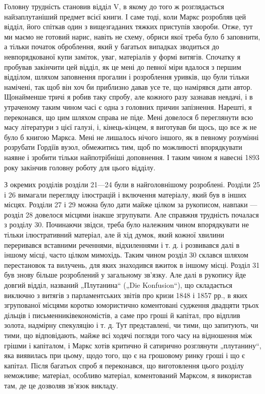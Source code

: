 Головну трудність становив відділ V, в якому до того ж
розглядається найзаплутаніший предмет всієї книги. І саме тоді,
коли Маркс розробляв цей відділ, його спіткав один з вищезгаданих
тяжких приступів хвороби. Отже, тут ми маємо не готовий
нарис, навіть не схему, обриси якої треба було б заповнити,
а тільки початок оброблення, який у багатьох випадках зводиться
до невпорядкованої купи заміток, уваг, матеріалів у формі
витягів. Спочатку я пробував закінчити цей відділ, як це мені
до певної міри вдалося з першим відділом, шляхом заповнення
прогалин і розроблення уривків, що були тільки намічені, так щоб
він хоч би приблизно давав усе те, що намірявся дати автор. Щонайменше
тричі я робив таку спробу, але кожного разу зазнавав
невдачі, і в утраченому таким чином часі є одна з головних причин
запізнення. Нарешті, я переконався, що цим шляхом справа
не піде. Мені довелося б переглянути всю масу літератури з цієї
галузі, і, кінець-кінцем, я виготував би щось, що все ж не було б
книгою Маркса. Мені не лишалось нічого іншого, як в певному
розумінні розрубати Гордіїв вузол, обмежитись тим, щоб по
можливості впорядкувати наявне і зробити тільки найпотрібніші
доповнення. І таким чином я навесні 1893 року закінчив головну
роботу для цього відділу.

З окремих розділів розділи 21—24 були в найголовнішому
розроблені. Розділи 25 і 26 вимагали перегляду ілюстрацій і
включення матеріалу, який був в інших місцях. Розділи 27 і 29 можна
було дати майже цілком за рукописом, навпаки — розділ 28 довелося
місцями інакше згрупувати. Але справжня трудність почалася
з розділу 30. Починаючи звідси, треба було належним чином
впорядкувати не тільки ілюстративний матеріал, але й хід думок,
який кожної хвилини переривався вставними реченнями, відхиленнями
і т. д. і розвивався далі в іншому місці, часто цілком мимохідь.
Таким чином розділ 30 склався шляхом перестановок та вилучень,
для яких знаходився вжиток в іншому місці. Розділ 31 був знову
більше розроблений у загальному зв’язку. Але далі в рукопису
йде довгий відділ, названий „Плутанина“ („Die Konfusion“), що
складається виключно з витягів з парламентських звітів про кризи
1848 і 1857 рр., в яких згрупованої місцями коротко юмористично
коментовані судження двадцяти трьох дільців і письменниківекономістів,
а саме про гроші й капітал, про відплив золота, надмірну
спекуляцію і т. д. Тут представлені, чи тими, що запитують,
чи тими, що відповідають, майже всі ходячі погляди того
часу на відношення між грішми і капіталом, і Маркс хотів критично
й сатирично розглянути „плутанину“, яка виявилась при цьому,
щодо того, що є на грошовому ринку гроші і що є капітал.
Після багатьох спроб я переконався, що виготовлення цього
розділу неможливе; матеріал, особливо матеріал, коментований
Марксом, я використав там, де це дозволяв зв’язок викладу.

